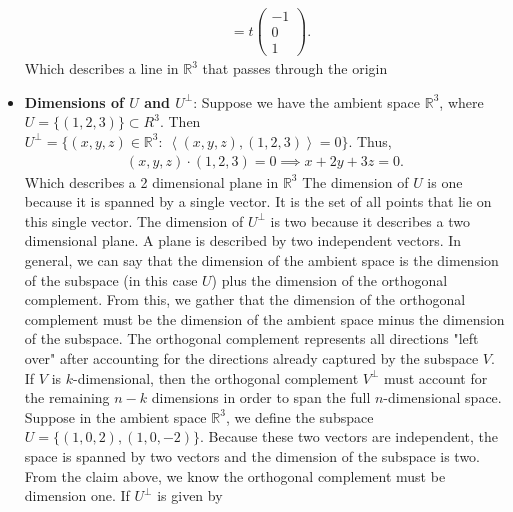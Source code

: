 \documentclass{report}
\begin{document}
\begin{itemize}
\begin{align*}
                                                          &= t \begin{pmatrix} -1 \\ 0 \\ 1 \end{pmatrix}
            .\end{align*}
            Which describes a line  in $\mathbb{R}^{3}$ that passes through the origin
        \item \textbf{Dimensions of $U$ and $U^{\perp}$}: Suppose we have the ambient space $\mathbb{R}^{3}$, where $U = \{(1,2,3)\} \subset R^{3}$. Then $U^{\perp} = \{(x,y,z) \in \mathbb{R}^{3}:\ \left\langle (x,y,z), (1,2,3) \right\rangle = 0 \}$. Thus,
            \begin{align*}
                (x,y,z) \cdot (1,2,3) = 0 \implies x + 2y + 3z = 0
            .\end{align*}
            \bigbreak \noindent 
            Which describes a 2 dimensional plane in $\mathbb{R}^{3}$
            \bigbreak \noindent
            The dimension of $U$ is one because it is spanned by a single vector. It is the set of all points that lie on this single vector. The dimension of $U^{\perp}$ is two because it describes a two dimensional plane. A plane is described by two independent vectors. 
            \bigbreak \noindent 
            In general, we can say that the dimension of the ambient space is the dimension of the subspace (in this case $U$) plus the dimension of the orthogonal complement. From this, we gather that the dimension of the orthogonal complement must be the dimension of the ambient space minus the dimension of the subspace.
            \bigbreak \noindent 
            The orthogonal complement represents all directions "left over" after accounting for the directions already captured by the subspace \(V\). If \(V\) is \(k\)-dimensional, then the orthogonal complement \(V^\perp\) must account for the remaining \(n - k\) dimensions in order to span the full \(n\)-dimensional space.
            \bigbreak \noindent 
            Suppose in the ambient space $\mathbb{R}^{3}$, we define the subspace $U = \{(1,0,2), (1,0,-2)\}$. Because these two vectors are independent, the space is spanned by two vectors and the dimension of the subspace is two. From the claim above, we know the orthogonal complement must be dimension one. If $U^{\perp} $ is given by


\end{itemize}
\end{document}

